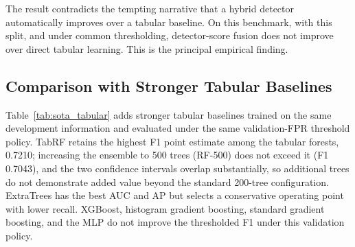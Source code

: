 \documentclass[10pt,journal,compsoc]{IEEEtran}
\begin{document}
The result contradicts the tempting narrative that a hybrid detector automatically improves over a tabular baseline. On this benchmark, with this split, and under common thresholding, detector-score fusion does not improve over direct tabular learning. This is the principal empirical finding.

\subsection{Comparison with Stronger Tabular Baselines}

Table~\ref{tab:sota_tabular} adds stronger tabular baselines trained on the same development information and evaluated under the same validation-FPR threshold policy. TabRF retains the highest F1 point estimate among the tabular forests, 0.7210; increasing the ensemble to 500 trees (RF-500) does not exceed it (F1 0.7043), and the two confidence intervals overlap substantially, so additional trees do not demonstrate added value beyond the standard 200-tree configuration. ExtraTrees has the best AUC and AP but selects a conservative operating point with lower recall. XGBoost, histogram gradient boosting, standard gradient boosting, and the MLP do not improve the thresholded F1 under this validation policy.
\end{document}
